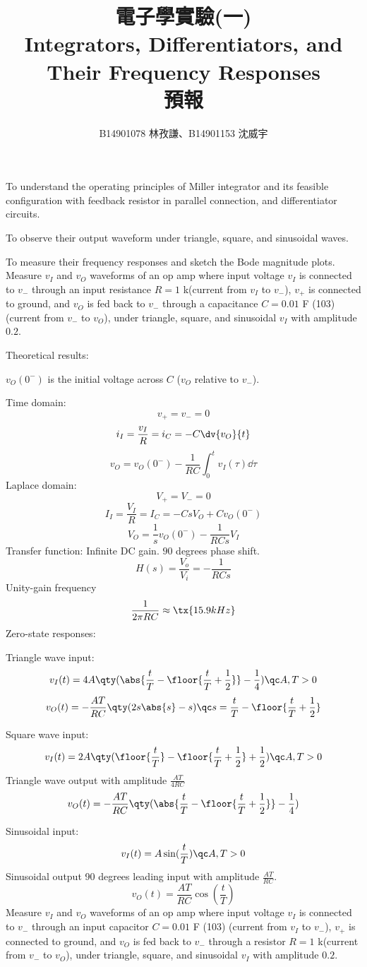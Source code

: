 \documentclass[a4paper,12pt]{article}
\begin{document}
\title{電子學實驗(一)\\Integrators, Differentiators, and Their Frequency Responses\\預報}
\author{B14901078 林孜謙、B14901153 沈威宇}
\date{}
\titledoc
{}
\bit
\item To understand the operating principles of Miller integrator and its feasible configuration with feedback resistor in parallel connection, and differentiator circuits.
\item To observe their output waveform under triangle, square, and sinusoidal waves.
\item To measure their frequency responses and sketch the Bode magnitude plots.
\eit
{}
Measure $v_I$ and $v_O$ waveforms of an op amp where input voltage $v_I$ is connected to $v_-$ through an input resistance $R=1$ k\textOmega (current from $v_I$ to $v_-$), $v_+$ is connected to ground, and $v_O$ is fed back to $v_-$ through a capacitance $C=0.01$ \textmu{}F (103) (current from $v_-$ to $v_O$), under triangle, square, and sinusoidal $v_I$ with amplitude $0.2$.

Theoretical results:

$v_O(0^-)$ is the initial voltage across $C$ ($v_O$ relative to $v_-$).

Time domain:
\[v_+=v_-=0\]
\[i_I=\frac{v_I}{R}=i_C=-C\dv{v_O}{t}\]
\[v_O=v_O(0^-)-\frac{1}{RC}\int_0^tv_I(\tau)\dd{\tau}\]
Laplace domain:
\[V_+=V_-=0\]
\[I_I=\frac{V_I}{R}=I_C=-CsV_O+Cv_O(0^-)\]
\[V_O=\frac{1}{s}v_O(0^-)-\frac{1}{RCs}V_I\]
Transfer function: Infinite DC gain. $90$ degrees phase shift.
\[H(s)=\frac{V_o}{V_i}=-\frac{1}{RCs}\]
Unity-gain frequency
\[\frac{1}{2\pi RC}\approx\tx{15.9 kHz}\]
Zero-state responses:
\bit
\item Triangle wave input:
\[v_I(t)=4A\qty(\abs{\frac{t}{T}-\floor{\frac{t}{T}+\frac{1}{2}}}-\frac{1}{4})\qc A,T>0\]
\[v_O(t)=-\frac{AT}{RC}\qty(2s\abs{s}-s)\qc s=\frac{t}{T}-\floor{\frac{t}{T}+\frac{1}{2}}\]
\item Square wave input:
\[v_I(t)=2A\qty(\floor{\frac{t}{T}}-\floor{\frac{t}{T}+\frac{1}{2}}+\frac{1}{2})\qc A,T>0\]
Triangle wave output with amplitude $\frac{AT}{4RC}$
\[v_O(t)=-\frac{AT}{RC}\qty(\abs{\frac{t}{T}-\floor{\frac{t}{T}+\frac{1}{2}}}-\frac{1}{4})\]
\item Sinusoidal input:
\[v_I(t)=A\sin(\frac{t}{T})\qc A,T>0\]
Sinusoidal output 90 degrees leading input with amplitude $\frac{AT}{RC}$.
\[v_O(t)=\frac{AT}{RC}\cos(\frac{t}{T})\]
\eit
{}
Measure $v_I$ and $v_O$ waveforms of an op amp where input voltage $v_I$ is connected to $v_-$ through an input capacitor $C=0.01$ \textmu{}F (103) (current from $v_I$ to $v_-$), $v_+$ is connected to ground, and $v_O$ is fed back to $v_-$ through a resistor $R=1$ k\textOmega (current from $v_-$ to $v_O$), under triangle, square, and sinusoidal $v_I$ with amplitude $0.2$.
\end{document}
